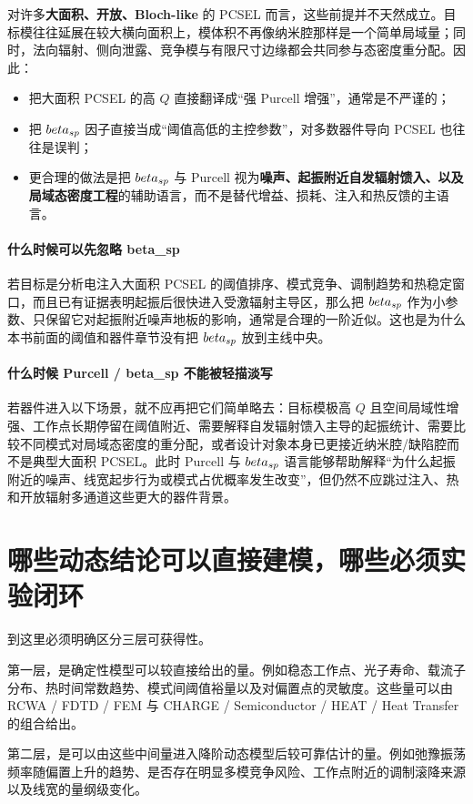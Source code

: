 对许多\textbf{大面积、开放、Bloch-like} 的 PCSEL 而言，这些前提并不天然成立。目标模往往延展在较大横向面积上，模体积不再像纳米腔那样是一个简单局域量；同时，法向辐射、侧向泄露、竞争模与有限尺寸边缘都会共同参与态密度重分配。因此：
\begin{itemize}
  \item 把大面积 PCSEL 的高 $Q$ 直接翻译成“强 Purcell 增强”，通常是不严谨的；
  \item 把 $beta_{sp}$ 因子直接当成“阈值高低的主控参数”，对多数器件导向 PCSEL 也往往是误判；
  \item 更合理的做法是把 $beta_{sp}$ 与 Purcell 视为\textbf{噪声、起振附近自发辐射馈入、以及局域态密度工程}的辅助语言，而不是替代增益、损耗、注入和热反馈的主语言。
\end{itemize}

\paragraph{什么时候可以先忽略 beta\_sp}
若目标是分析电注入大面积 PCSEL 的阈值排序、模式竞争、调制趋势和热稳定窗口，而且已有证据表明起振后很快进入受激辐射主导区，那么把 $beta_{sp}$ 作为小参数、只保留它对起振附近噪声地板的影响，通常是合理的一阶近似。这也是为什么本书前面的阈值和器件章节没有把 $beta_{sp}$ 放到主线中央。

\paragraph{什么时候 Purcell / beta\_sp 不能被轻描淡写}
若器件进入以下场景，就不应再把它们简单略去：目标模极高 $Q$ 且空间局域性增强、工作点长期停留在阈值附近、需要解释自发辐射馈入主导的起振统计、需要比较不同模式对局域态密度的重分配，或者设计对象本身已更接近纳米腔/缺陷腔而不是典型大面积 PCSEL。此时 Purcell 与 $beta_{sp}$ 语言能够帮助解释“为什么起振附近的噪声、线宽起步行为或模式占优概率发生改变”，但仍然不应跳过注入、热和开放辐射多通道这些更大的器件背景。

\section{哪些动态结论可以直接建模，哪些必须实验闭环}
到这里必须明确区分三层可获得性。

第一层，是确定性模型可以较直接给出的量。例如稳态工作点、光子寿命、载流子分布、热时间常数趋势、模式间阈值裕量以及对偏置点的灵敏度。这些量可以由 RCWA / FDTD / FEM 与 CHARGE / Semiconductor / HEAT / Heat Transfer 的组合给出。

第二层，是可以由这些中间量进入降阶动态模型后较可靠估计的量。例如弛豫振荡频率随偏置上升的趋势、是否存在明显多模竞争风险、工作点附近的调制滚降来源以及线宽的量纲级变化。

